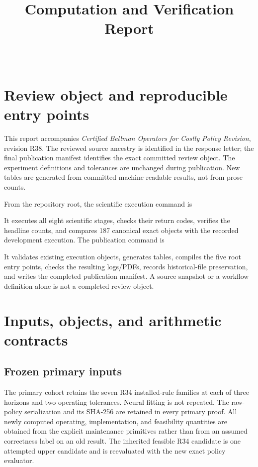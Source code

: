 

\begin{frontmatter}
\title{Computation and Verification Report}
\begin{aug}\author[id=au1,addressref={add1}]{~}\address[id=add1]{}\end{aug}
\end{frontmatter}

\section{Review object and reproducible entry points}
This report accompanies \emph{Certified Bellman Operators for Costly Policy Revision}, revision R38. The reviewed source ancestry is identified in the response letter; the final publication manifest identifies the exact committed review object. The experiment definitions and tolerances are unchanged during publication. New tables are generated from committed machine-readable results, not from prose counts.

From the repository root, the scientific execution command is
\begin{quote}\small{}\end{quote}
It executes all eight scientific stages, checks their return codes, verifies the headline counts, and compares 187 canonical exact objects with the recorded development execution. The publication command is
\begin{quote}\small{}\end{quote}
It validates existing execution objects, generates tables, compiles the five root entry points, checks the resulting logs/PDFs, records historical-file preservation, and writes the completed publication manifest. A source snapshot or a workflow definition alone is not a completed review object.

\section{Inputs, objects, and arithmetic contracts}
\subsection{Frozen primary inputs}
The primary cohort retains the seven R34 installed-rule families at each of three horizons and two operating tolerances. Neural fitting is not repeated. The raw-policy serialization and its SHA-256 are retained in every primary proof. All newly computed operating, implementation, and feasibility quantities are obtained from the explicit maintenance primitives rather than from an assumed correctness label on an old result. The inherited feasible R34 candidate is one attempted upper candidate and is reevaluated with the new exact policy evaluator.

